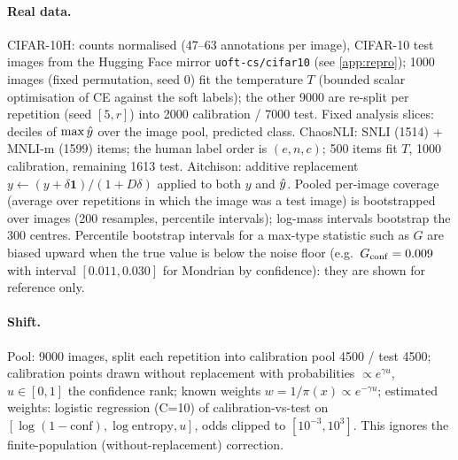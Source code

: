 \paragraph{Real data.} CIFAR-10H: counts normalised (47--63 annotations per image), CIFAR-10 test images from the Hugging Face mirror \texttt{uoft-cs/cifar10} (see \cref{app:repro}); 1000 images (fixed permutation, seed 0) fit the temperature $T$ (bounded scalar optimisation of CE against the soft labels); the other 9000 are re-split per repetition (seed $[5,r]$) into 2000 calibration / 7000 test. Fixed analysis slices: deciles of $\max\hat y$ over the image pool, predicted class. ChaosNLI: SNLI (1514) + MNLI-m (1599) items; the human label order is $(e,n,c)$; 500 items fit $T$, 1000 calibration, remaining 1613 test. Aitchison: additive replacement $y\leftarrow(y+\delta\mathbf 1)/(1+D\delta)$ applied to both $y$ and $\hat y$. Pooled per-image coverage (average over repetitions in which the image was a test image) is bootstrapped over images (200 resamples, percentile intervals); log-mass intervals bootstrap the 300 centres. Percentile bootstrap intervals for a max-type statistic such as $G$ are biased upward when the true value is below the noise floor (e.g.\ $G_{\rm conf}=0.009$ with interval $[0.011,0.030]$ for Mondrian by confidence): they are shown for reference only.
\paragraph{Shift.} Pool: 9000 images, split each repetition into calibration pool 4500 / test 4500; calibration points drawn without replacement with probabilities $\propto e^{\gamma u}$, $u\in[0,1]$ the confidence rank; known weights $w=1/\pi(x)\propto e^{-\gamma u}$; estimated weights: logistic regression (C=10) of calibration-vs-test on $[\log(1-\text{conf}),\log\text{entropy},u]$, odds clipped to $[10^{-3},10^3]$. This ignores the finite-population (without-replacement) correction.

